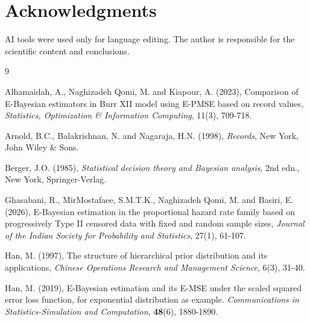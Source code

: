 \documentclass[twoside]{article}
\begin{document}
\section*{Acknowledgments}   
AI tools were used only for language editing. The author is responsible for the scientific content and conclusions.
\begin{thebibliography}{9}


Alhamaidah, A., Naghizadeh Qomi, M. and  Kiapour, A. (2023), Comparison of E-Bayesian estimators in Burr XII model using E-PMSE based on record values, 
{\it Statistics, Optimization \& Information Computing},  {11}(3), 709-718.


Arnold, B.C., Balakrishnan, N. and Nagaraja, H.N. (1998), {\it Records}, New York, John Wiley \& Sons.


Berger, J.O. (1985), {\it Statistical decision theory and Bayesian analysis}, 2nd edn., New York, Springer-Verlag.

Ghasabani, R., MirMostafaee, S.M.T.K., Naghizadeh Qomi, M. and  Basiri, E. (2026), E-Bayesian estimation in the proportional hazard rate family based on progressively Type II censored data with fixed and random sample sizes, {\it Journal of the Indian Society for Probability and Statistics}, 27(1), 61-107.

Han, M. (1997), The structure of hierarchical prior distribution and its applications, {\it Chinese Operations Research and Management Science},  {6}(3), 31-40.

Han, M. (2019), E-Bayesian estimation and its E-MSE under the scaled squared error loss function, for exponential distribution as example.   {\it Communications in Statistics-Simulation and Computation}, \textbf{48}(6), 1880-1890.


\end{thebibliography}
\end{document}
